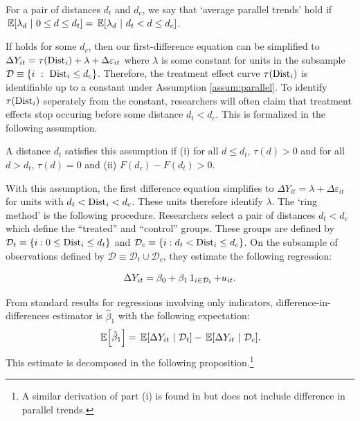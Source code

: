 \begin{assumption}\label{assum:parallel_weak}
    For a pair of distances $d_t$ and $d_c$, we say that `average parallel trends' hold if $\expec{\lambda_d}{0 \leq d \leq d_t} = \expec{\lambda_d}{d_t < d \leq d_c}$.
\end{assumption}

If  holds for some $d_c$, then our first-difference equation can be simplified to $\Delta Y_{it} = \tau(\text{Dist}_i) + \lambda + \Delta \varepsilon_{it}$ where $\lambda$ is some constant for units in the subsample $\mathcal{D} \equiv \{i \ : \ \text{Dist}_i \leq d_c \} $. Therefore, the treatment effect curve $\tau(\text{Dist}_i)$ is identifiable up to a constant under Assumption \ref{assum:parallel}. To identify $\tau(\text{Dist}_i)$ seperately from the constant, researchers will often claim that treatment effects stop occuring before some distance $d_t < d_c$. This is formalized in  the following assumption. 

\begin{assumption}[Correct $d_t$]\label{assum:dt}
    A distance $d_t$ satisfies this assumption if (i) for all $d \leq d_t$, $\tau(d) > 0$ and for all $d > d_t$, $\tau(d) = 0$ and (ii) $F(d_c) - F(d_t) > 0$.
\end{assumption}

With this assumption, the first difference equation simplifies to $\Delta Y_{it} = \lambda + \Delta \varepsilon_{it}$ for units with $d_t < \text{Dist}_i < d_c$. These units therefore identify $\lambda$. The `ring method' is the following procedure. Researchers select a pair of distances $d_t < d_c$ which define the ``treated'' and ``control'' groups. These groups are defined by $\mathcal{D}_t \equiv \{ i : 0 \leq \text{Dist}_i \leq d_t \}$ and $\mathcal{D}_c \equiv \{ i : d_t < \text{Dist}_i \leq d_c \}$. On the subsample of observations defined by $\mathcal{D} \equiv \mathcal{D}_t \cup \mathcal{D}_c$, they estimate the following regression:

\begin{equation}\label{eq:ring_method}
    \Delta Y_{it} = \beta_0 + \beta_1 \one_{i \in \mathcal{D}_t} + u_{it}.
\end{equation}

From standard results for regressions involving only indicators, difference-in-differences estimator is $\hat{\beta}_1$ with the following expectation:
\[
    \expec{\hat{\beta}_1} = \expec{\Delta Y_{it}}{\mathcal{D}_t} - \expec{\Delta Y_{it}}{\mathcal{D}_c}.
\]
This estimate is decomposed in the following proposition.\footnote{A similar derivation of part (i) is found in \citet{Sullivan_2017} but does not include difference in parallel trends.}

